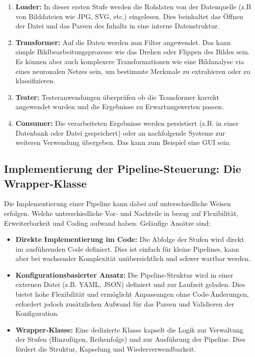 \documentclass[a4paper]{article} %
\begin{document}
\begin{enumerate}
    \item \textbf{Loader:} In dieser ersten Stufe werden die Rohdaten von der Datenquelle (z.B von Bilddateien wie JPG, SVG, etc.) eingelesen. Dies beinhaltet das Öffnen der Datei und das Parsen des Inhalts in eine interne Datenstruktur.
    \item \textbf{Transformer:} Auf die Daten werden nun Filter angewendet. Das kann simple Bildbearbeitungsprozesse wie das Drehen oder Flippen des Bildes sein. Es können aber auch komplexere Transformationen wie eine Bildanalyse via eines neuronalen Netzes sein, um bestimmte Merkmale zu extrahieren oder zu klassifizieren.
    \item \textbf{Tester:} Testeranwendungen überprüfen ob die Transformer korrekt angewendet wurden und die Ergebnisse zu Erwartungswerten passen.
    \item \textbf{Consumer:} Die verarbeiteten Ergebnisse werden persistiert (z.B. in einer Datenbank oder Datei gespeichert) oder an nachfolgende Systeme zur weiteren Verwendung übergeben. Das kann zum Beispiel eine GUI sein.
\end{enumerate}


\subsection{Implementierung der Pipeline-Steuerung: Die Wrapper-Klasse}
Die Implementierung einer Pipeline kann dabei auf unterschiedliche Weisen erfolgen. Welche unterschiedliche Vor- und Nachteile in bezug auf Flexibilität, Erweiterbarkeit und Coding aufwand haben. Geläufige Ansätze sind:

\begin{itemize}
    \item \textbf{Direkte Implementierung im Code:} Die Abfolge der Stufen wird direkt im ausführenden Code definiert. Dies ist einfach für kleine Pipelines, kann aber bei wachsender Komplexität unübersichtlich und schwer wartbar werden.
    \item \textbf{Konfigurationsbasierter Ansatz:} Die Pipeline-Struktur wird in einer externen Datei (z.B. YAML, JSON) definiert und zur Laufzeit geladen. Dies bietet hohe Flexibilität und ermöglicht Anpassungen ohne Code-Änderungen, erfordert jedoch zusätzlichen Aufwand für das Parsen und Validieren der Konfiguration.
    \item \textbf{Wrapper-Klasse:} Eine dedizierte Klasse kapselt die Logik zur Verwaltung der Stufen (Hinzufügen, Reihenfolge) und zur Ausführung der Pipeline. Dies fördert die Struktur, Kapselung und Wiederverwendbarkeit.
\end{itemize}
\end{document}
